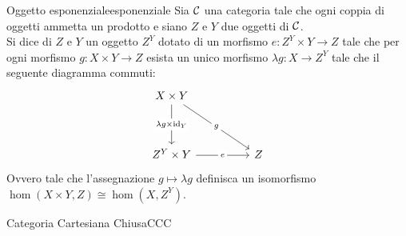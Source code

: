 \documentclass{article}
\renewcommand\C{\mc{C}}
\begin{document}
\begin{definition}{Oggetto esponenziale}{esponenziale}
    Sia $\C$ una categoria tale che ogni coppia di oggetti ammetta un prodotto e siano $Z$ e $Y$ due oggetti di $\C$.\\
    Si dice  di $Z$ e $Y$ un oggetto $Z^Y$ dotato di un morfismo $e: Z^Y\times Y \to Z$ tale che per ogni morfismo $g : X\times Y \to Z$ esista un unico morfismo $\lambda g : X\to Z^Y$ tale che il seguente diagramma commuti:
    \[\begin{tikzcd}
    	{X\times Y} \\
    	\\
    	{Z^Y\times Y} && Z
    	\arrow["{\lambda g\times \id_Y}"{description}, from=1-1, to=3-1]
    	\arrow["g"{description}, from=1-1, to=3-3]
    	\arrow["e"{description}, from=3-1, to=3-3]
    \end{tikzcd}\]
    Ovvero tale che l'assegnazione $g \mapsto \lambda g$ definisca un isomorfismo $\hom(X\times Y, Z)\cong \hom(X, Z^Y)$.
\end{definition}

\begin{definition}{Categoria Cartesiana Chiusa}{CCC}
    
\end{definition}
\end{document}
